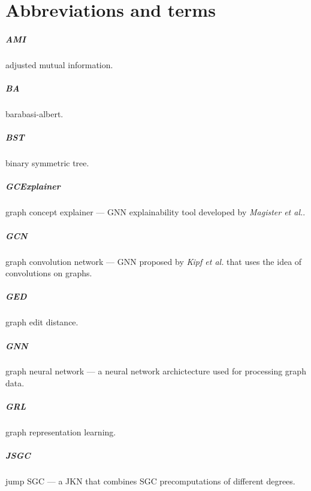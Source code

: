 \chapter{Abbreviations and terms}

\paragraph{AMI}
adjusted mutual information.

\paragraph{BA}
barabasi-albert.

\paragraph{BST}
binary symmetric tree.

\paragraph{GCExplainer}
graph concept explainer --- GNN explainability tool developed by \textit{Magister et al.}\cite{magister2021gcexplainer}.

\paragraph{GCN}
graph convolution network --- GNN proposed by \textit{Kipf et al.}\cite{kipf2016semi} that uses the idea of convolutions on graphs.

\paragraph{GED}
graph edit distance.

\paragraph{GNN}
graph neural network --- a neural network archictecture used for processing graph data.

\paragraph{GRL}
graph representation learning.

\paragraph{JSGC}
jump SGC --- a JKN that combines SGC precomputations of different degrees.

